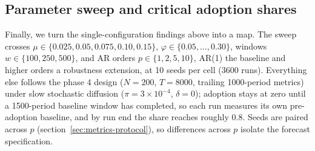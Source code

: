 \documentclass[12pt]{article}
\begin{document}
\subsection{Parameter sweep and critical adoption shares}\label{sec:phase6-results}

Finally, we turn the single-configuration findings above into a map. The sweep crosses $\mu\in\{0.025, 0.05, 0.075, 0.10, 0.15\}$, $\varphi\in\{0.05,\dots,0.30\}$, windows $w\in\{100, 250, 500\}$, and AR orders $p\in\{1, 2, 5, 10\}$, AR(1) the baseline and higher orders a robustness extension, at 10 seeds per cell (3600 runs). %
Everything else follows the phase 4 design ($N=200$, $T=8000$, trailing 1000-period metrics) under slow stochastic diffusion ($\pi=3\times10^{-4}$, $\delta=0$); adoption stays at zero until a 1500-period baseline window has completed, so each run measures its own pre-adoption baseline, and by run end the share reaches roughly 0.8. %
Seeds are paired across $p$ (section~\ref{sec:metrics-protocol}), so differences across $p$ isolate the forecast specification. %
\end{document}
